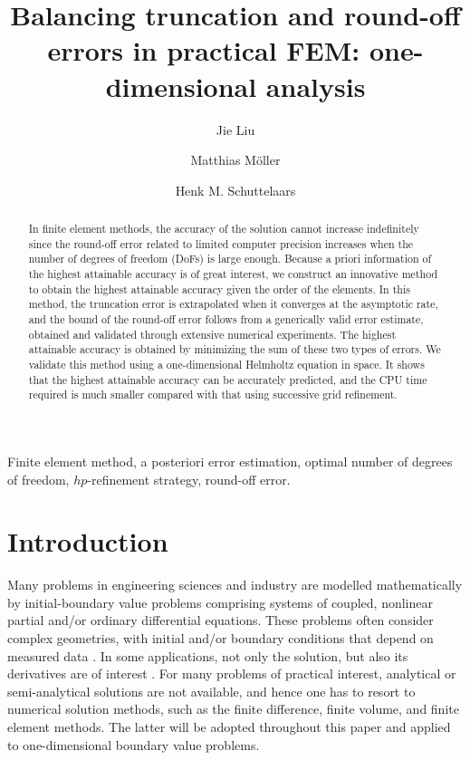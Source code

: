 \documentclass[review,3p]{elsarticle}
\begin{document}
\begin{frontmatter}

\title{Balancing truncation and round-off errors in practical FEM: one-dimensional analysis}

 \author[1]{Jie Liu}
 \author[1]{Matthias M\"oller}
 \author[1]{Henk M. Schuttelaars}
 
 \address[1]{Delft Institute of Applied Mathematics\\ Delft University of Technology\\ Van Mourik Broekmanweg 6, 2628 XE Delft, The Netherlands}

\begin{abstract}
In finite element methods, the accuracy of the solution cannot increase indefinitely since the round-off error related to limited computer precision increases when the number of degrees of freedom (DoFs) is large enough. Because a priori information of the highest attainable accuracy is of great interest, we construct an innovative method to obtain the highest attainable accuracy given the order of the elements.
In this method, the truncation error is extrapolated when it converges at the asymptotic rate, and the bound of the round-off error follows from a generically valid error estimate, obtained and validated through extensive numerical experiments. The highest attainable accuracy is obtained by minimizing the sum of these two types of errors.
We validate this method using a one-dimensional Helmholtz equation in space. 
It shows that the highest attainable accuracy can be accurately predicted, and the CPU time required is much smaller compared with that using successive grid refinement. 
\end{abstract}

\begin{keyword}
Finite element method, a posteriori error estimation, optimal number of degrees of freedom, $hp$-refinement strategy, round-off error.
\end{keyword}

\end{frontmatter}

\section{Introduction}

Many problems in engineering sciences and industry are modelled mathematically by initial-boundary value problems comprising systems of coupled, nonlinear partial and/or ordinary differential equations. These problems often consider complex geometries, with initial and/or boundary conditions that depend on measured data \cite{Kumar2016}. 
In some applications, not only the solution, but also its derivatives are of interest \cite{Kumar2016,carey1982derivative}.
For many problems of practical interest, analytical or semi-analytical solutions are not available, and hence one has to resort to numerical solution methods, such as the finite difference, finite volume, and finite element methods. The latter will be adopted throughout this paper and applied to one-dimensional boundary value problems.
\end{document}
